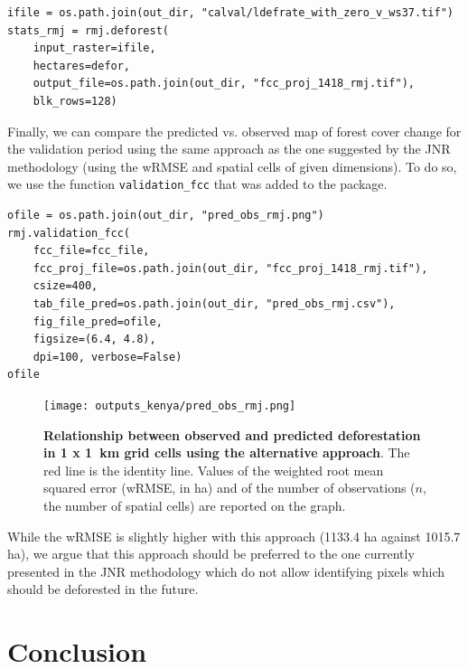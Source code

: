 \documentclass[paper=a4, 12pt, DIV=12]{scrartcl}
\begin{document}
\begin{verbatim}
ifile = os.path.join(out_dir, "calval/ldefrate_with_zero_v_ws37.tif")
stats_rmj = rmj.deforest(
    input_raster=ifile,
    hectares=defor,
    output_file=os.path.join(out_dir, "fcc_proj_1418_rmj.tif"),
    blk_rows=128)
\end{verbatim}

Finally, we can compare the predicted vs. observed map of forest cover change for the validation period using the same approach as the one suggested by the JNR methodology (using the wRMSE and spatial cells of given dimensions). To do so, we use the function \texttt{validation\_fcc} that was added to the package.

\begin{verbatim}
ofile = os.path.join(out_dir, "pred_obs_rmj.png")
rmj.validation_fcc(
    fcc_file=fcc_file,
    fcc_proj_file=os.path.join(out_dir, "fcc_proj_1418_rmj.tif"),
    csize=400,
    tab_file_pred=os.path.join(out_dir, "pred_obs_rmj.csv"),
    fig_file_pred=ofile,
    figsize=(6.4, 4.8),
    dpi=100, verbose=False)
ofile
\end{verbatim}

\begin{figure}[H]
\centering
\texttt{[image: outputs\_kenya/pred\_obs\_rmj.png]}
\caption{\label{fig:org14688bd}\textbf{Relationship between observed and predicted deforestation in 1 x 1 km grid cells using the alternative approach}. The red line is the identity line. Values of the weighted root mean squared error (wRMSE, in ha) and of the number of observations (\(n\), the number of spatial cells) are reported on the graph.}
\end{figure}

While the wRMSE is slightly higher with this approach (1133.4 ha against 1015.7 ha), we argue that this approach should be preferred to the one currently presented in the JNR methodology which do not allow identifying pixels which should be deforested in the future.

\section{Conclusion}
\label{sec:org74c3f54}
\end{document}
